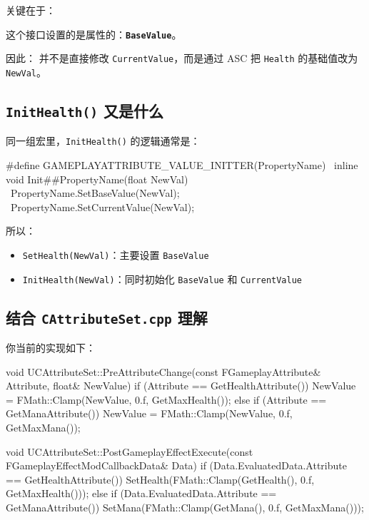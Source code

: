 关键在于：	

这个接口设置的是属性的：\textbf{\texttt{BaseValue}}。


因此：	并不是直接修改 \texttt{CurrentValue}，而是通过 ASC 把 \texttt{Health} 的基础值改为 \texttt{NewVal}。

\subsection{\texttt{InitHealth()} 又是什么}

同一组宏里，\texttt{InitHealth()} 的逻辑通常是：

\begin{code}[language=C++]
	#define GAMEPLAYATTRIBUTE_VALUE_INITTER(PropertyName) \
	inline void Init##PropertyName(float NewVal) \
	{ \
		PropertyName.SetBaseValue(NewVal); \
		PropertyName.SetCurrentValue(NewVal); \
	}
\end{code}

所以：

\begin{itemize}
	\item \texttt{SetHealth(NewVal)}：主要设置 \texttt{BaseValue}
	\item \texttt{InitHealth(NewVal)}：同时初始化 \texttt{BaseValue} 和 \texttt{CurrentValue}
\end{itemize}

\subsection{结合 \texttt{CAttributeSet.cpp} 理解}

你当前的实现如下：

\begin{code}[language=C++]
	void UCAttributeSet::PreAttributeChange(const FGameplayAttribute& Attribute, float& NewValue)
	{
		if (Attribute == GetHealthAttribute())
		{
			NewValue = FMath::Clamp(NewValue, 0.f, GetMaxHealth());
		}
		else if (Attribute == GetManaAttribute())
		{
			NewValue = FMath::Clamp(NewValue, 0.f, GetMaxMana());
		}
	}
	
	void UCAttributeSet::PostGameplayEffectExecute(const FGameplayEffectModCallbackData& Data)
	{
		if (Data.EvaluatedData.Attribute == GetHealthAttribute())
		{
			SetHealth(FMath::Clamp(GetHealth(), 0.f, GetMaxHealth()));
		}
		else if (Data.EvaluatedData.Attribute == GetManaAttribute())
		{
			SetMana(FMath::Clamp(GetMana(), 0.f, GetMaxMana()));
		}
	}
\end{code}

